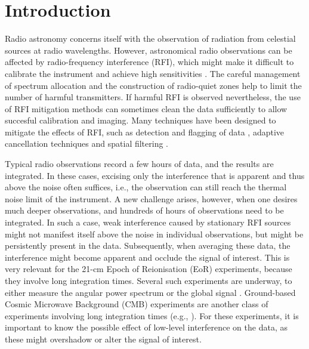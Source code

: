 \documentclass[useAMS,usenatbib]{mn2e}
\begin{document}
\section{Introduction}
Radio astronomy concerns itself with the observation of radiation from celestial sources at radio wavelengths. However, astronomical radio observations can be affected by radio-frequency interference (RFI), which might make it difficult to calibrate the instrument and achieve high sensitivities \citep{impact-of-warc79,interference-and-radioastronomy-1991,interference-model-lemmon,rfi-mitigation-overview-fridman-baan}. The careful management of spectrum allocation and the construction of radio-quiet zones help to limit the number of harmful transmitters. If harmful RFI is observed nevertheless, the use of RFI mitigation methods can sometimes clean the data sufficiently to allow succesful calibration and imaging. Many techniques have been designed to mitigate the effects of RFI, such as detection and flagging of data \citep{chi-square-time-blanking-weber, multichannel-rfi-mitigation, exoplanet-detection-with-rfi, wsrt-rfims, pulse-blanking, effelsberg-rfi-mitigation, post-correlation-rfi-classification}, adaptive cancellation techniques \citep{adaptive-cancellation,post-correlation-reference-signal} and spatial filtering \citep{multichannel-rfi-mitigation, ellingson-spatial-nulling-2002, hampson-spatial-nulling-2002, boonstra-dissertation, spatial-filtering-parkes-multibeam-for-pulses, post-correlation-filtering}. 

Typical radio observations record a few hours of data, and the results are integrated. In these cases, excising only the interference that is apparent and thus above the noise often suffices, i.e., the observation can still reach the thermal noise limit of the instrument. A new challenge arises, however, when one desires much deeper observations, and hundreds of hours of observations need to be integrated. In such a case, weak interference caused by stationary RFI sources might not manifest itself above the noise in individual observations, but might be persistently present in the data. Subsequently, when averaging these data, the interference might become apparent and occlude the signal of interest. This is very relevant for the 21-cm Epoch of Reionisation (EoR) experiments, because they involve long integration times. Several such experiments are underway, to either measure the angular power spectrum \citep{gmrt-eor-2011-paciga,de-bruyn-eor-ursi-2011,eor-paper-2011-jacobs,eor-mwa-2012-williams} or the global signal \citep{edges}. Ground-based Cosmic Microwave Background (CMB) experiments are another class of experiments involving long integration times (e.g., \citealt{ska-cmb-subrahmanyan}). For these experiments, it is important to know the possible effect of low-level interference on the data, as these might overshadow or alter the signal of interest.
\end{document}
